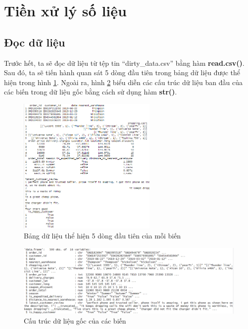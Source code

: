 \section{Tiền xử lý số liệu}
\subsection{Đọc dữ liệu}
Trước hết, ta sẽ đọc dữ liệu từ tệp tin ``dirty\_data.csv'' bằng hàm \textbf{read.csv()}. Sau đó, ta sẽ tiến hành quan sát 5 dòng đầu tiên trong bảng dữ liệu được thể hiện trong hình \ref{fig:3.1}. Ngoài ra, hình \ref{fig:3.2} biểu diễn các cấu trúc dữ liệu ban đầu của các biến trong dữ liệu gốc bằng cách sử dụng hàm \textbf{str()}.
\begin{figure}[!htbp]
    \centering
    \includegraphics[width=0.6\textwidth]{graphics/Pre_processing_data/f8.PNG}
    \caption{Bảng dữ liệu thể hiện 5 dòng đầu tiên của mỗi biến}
    \label{fig:3.1}
\end{figure}

\begin{figure}[!htbp]
    \centering
    \includegraphics[width=1\textwidth]{graphics/Pre_processing_data/f9.PNG}
    \caption{Cấu trúc dữ liệu gốc của các biến}
    \label{fig:3.2}
\end{figure}
